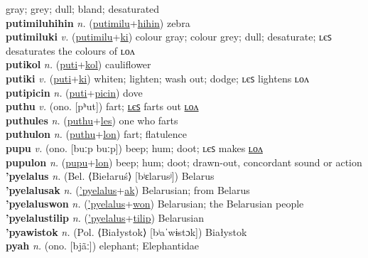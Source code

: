 gray; grey; dull; bland; desaturated \label{putimilulon} \\
\textbf{putimiluhihin} \textit{n.} (\hyperref[putimilu]{putimilu}+\hyperref[hihin]{hihin})
zebra \label{putimiluhihin} \\
\textbf{putimiluki} \textit{v.} (\hyperref[putimilu]{putimilu}+\hyperref[ki]{ki})
colour gray; colour grey; dull; desaturate; ʟєꜱ desaturates the colours of ʟᴏᴧ \label{putimiluki} \\
\textbf{putikol} \textit{n.} (\hyperref[puti]{puti}+\hyperref[kol]{kol})
cauliflower \label{putikol} \\
\textbf{putiki} \textit{v.} (\hyperref[puti]{puti}+\hyperref[ki]{ki})
whiten; lighten; wash out; dodge; ʟєꜱ lightens ʟᴏᴧ \label{putiki} \\
\textbf{putipicin} \textit{n.} (\hyperref[puti]{puti}+\hyperref[picin]{picin})
dove \label{putipicin} \\
\textbf{puthu} \textit{v.} (ono. [pʰut])
fart; \hyperref[puthules]{ʟєꜱ} farts out \hyperref[puthulon]{ʟᴏᴧ} \label{puthu} \\
\textbf{puthules} \textit{n.} (\hyperref[puthu]{puthu}+\hyperref[les]{les})
one who farts \label{puthules} \\
\textbf{puthulon} \textit{n.} (\hyperref[puthu]{puthu}+\hyperref[lon]{lon})
fart; flatulence \label{puthulon} \\
\textbf{pupu} \textit{v.} (ono. [buːp buːp])
beep; hum; doot; ʟєꜱ makes \hyperref[pupulon]{ʟᴏᴧ} \label{pupu} \\
\textbf{pupulon} \textit{n.} (\hyperref[pupu]{pupu}+\hyperref[lon]{lon})
beep; hum; doot; drawn-out, concordant sound or action \label{pupulon} \\
\textbf{'pyelalus} \textit{n.} (Bel. ⟨Biełaruś⟩ [bʲɛlarusʲ])
Belarus \label{'pyelalus} \\
\textbf{'pyelalusak} \textit{n.} (\hyperref['pyelalus]{'pyelalus}+\hyperref[ak]{ak})
Belarusian; from Belarus \label{'pyelalusak} \\
\textbf{'pyelaluswon} \textit{n.} (\hyperref['pyelalus]{'pyelalus}+\hyperref[won]{won})
Belarusian; the Belarusian people \label{'pyelaluswon} \\
\textbf{'pyelalustilip} \textit{n.} (\hyperref['pyelalus]{'pyelalus}+\hyperref[tilip]{tilip})
Belarusian \label{'pyelalustilip} \\
\textbf{'pyawistok} \textit{n.} (Pol. ⟨Białystok⟩ [bʲaˈwɨstɔk])
Białystok \label{'pyawistok} \\
\textbf{pyah} \textit{n.} (ono. [bjãː])
elephant; Elephantidae \label{pyah} \\
